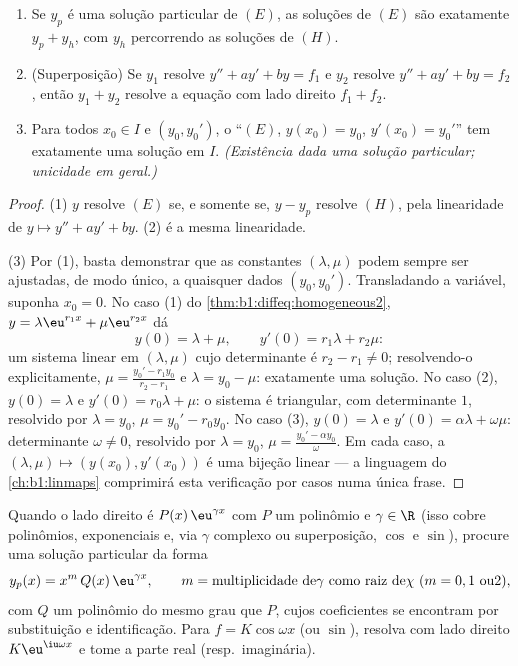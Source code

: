 \begin{theorem}\label{thm:b1:diffeq:structure2}
\begin{enumerate}
  \item Se $y_p$ é uma solução particular de $(E)$, as soluções de
        $(E)$ são exatamente $y_p + y_h$, com $y_h$ percorrendo as
        soluções de $(H)$.
  \item (Superposição) Se $y_1$ resolve $y'' + ay' + by = f_1$ e
        $y_2$ resolve $y'' + ay' + by = f_2$, então $y_1 + y_2$ resolve
        a equação com lado direito $f_1 + f_2$.
  \item Para todos $x_0 \in I$ e $(y_0, y_0')$, o 
        ``$(E)$, $y(x_0) = y_0$, $y'(x_0) = y_0'$'' tem exatamente uma
        solução em $I$. \emph{(Existência dada uma solução
        particular; unicidade em geral.)}
\end{enumerate}
\end{theorem}

\begin{proof}
(1) $y$ resolve $(E)$ se, e somente se, $y - y_p$ resolve $(H)$, pela
linearidade de $y
\mapsto y'' + ay' + by$. (2) é a mesma linearidade.

(3) Por (1), basta demonstrar que as constantes $(\lambda,
\mu)$ podem
sempre ser ajustadas, de modo único, a quaisquer dados $(y_0, y_0')$.
Transladando a variável, suponha $x_0 = 0$. No caso (1) do
\cref{thm:b1:diffeq:homogeneous2}, $y = \lambda\eu^{r_1x} +
\mu\eu^{r_2x}$ dá
\[
y(0) = \lambda + \mu, \qquad y'(0) = r_1\lambda + r_2\mu :
\]
um sistema linear em $(\lambda, \mu)$ cujo determinante é $r_2 -
r_1 \neq 0$; resolvendo-o explicitamente, $\mu = \frac{y_0' -
r_1y_0}{r_2 - r_1}$ e $\lambda = y_0 - \mu$: exatamente uma
solução. No caso (2), $y(0) = \lambda$ e $y'(0) = r_0\lambda +
\mu$: o sistema é triangular, com determinante $1$, resolvido por
$\lambda = y_0$, $\mu = y_0' - r_0y_0$. No caso (3), $y(0) =
\lambda$ e $y'(0) = \alpha\lambda + \omega\mu$: determinante
$\omega \neq 0$, resolvido por $\lambda = y_0$, $\mu = \frac{y_0' -
\alpha y_0}\omega$. Em cada caso, a  $(\lambda, \mu) \mapsto
(y(x_0), y'(x_0))$ é uma bijeção linear --- a linguagem do
\cref{ch:b1:linmaps} comprimirá esta verificação por casos numa única
frase.
\end{proof}

\begin{method}[Solução particular para $f(x) = P(x)\,\eu^{\gamma x}$]\label{met:b1:diffeq:particular}
Quando o lado direito é $P(x)\,\eu^{\gamma x}$ com $P$ um
polinômio e $\gamma \in \R$ (isso cobre polinômios, exponenciais e,
via $\gamma$ complexo ou superposição, $\cos$ e $\sin$), procure
uma solução particular da forma
\[
y_p(x) = x^{m}\, Q(x)\, \eu^{\gamma x},
\qquad
m = \text{multiplicidade de} \gamma \text{ como raiz de} \chi
\ (m = 0, 1 \text{ ou} 2),
\]
com $Q$ um polinômio do mesmo grau que $P$, cujos coeficientes
se encontram por substituição e identificação. Para $f = K\cos\omega x$
(ou $\sin$), resolva com lado direito $K\eu^{\iu\omega x}$ e tome
a parte real (resp.\ imaginária).
\end{method}

